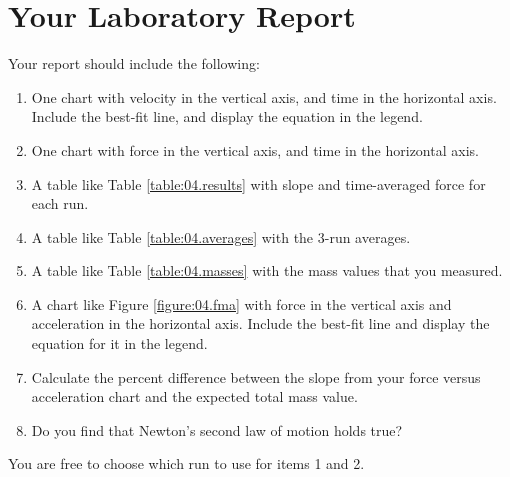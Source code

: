 \section{Your Laboratory Report}
Your report should include the following:
\begin{enumerate}
    \item One chart with velocity in the vertical axis, and time in the horizontal axis. Include the best-fit line, and display the equation in the legend.
    \item One chart with force in the vertical axis, and time in the horizontal axis.
    \item A table like Table \ref{table:04.results} with slope and time-averaged force for each run.
    \item A table like Table \ref{table:04.averages} with the 3-run averages.
    \item A table like Table \ref{table:04.masses} with the mass values that you measured.
    \item A chart like Figure \ref{figure:04.fma} with force in the vertical axis and acceleration in the horizontal axis. Include the best-fit line and display the equation for it in the legend.
    \item Calculate the percent difference between the slope from your force versus acceleration chart and the expected total mass value.
    \item Do you find that Newton's second law of motion holds true?
\end{enumerate}
You are free to choose which run to use for items 1 and 2.
\newpage
